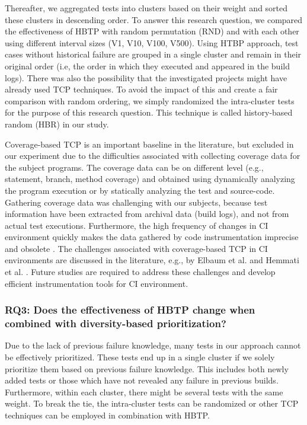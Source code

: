 \documentclass[1p]{elsarticle}
\begin{document}
Thereafter, we aggregated tests into clusters based on their weight and sorted these clusters in descending order. To answer this research question, we compared the effectiveness of HBTP with random permutation (RND) and with each other using different interval sizes (V1, V10, V100, V500). Using HTBP approach, test cases without historical failure are grouped in a single cluster and remain in their original order (i.e, the order in which they executed and appeared in the build logs). There was also the possibility that the investigated projects might have already used TCP techniques. To avoid the impact of this and create a fair comparison with random ordering, we simply randomized the intra-cluster tests for the purpose of this research question. This technique is called history-based random (HBR) in our study.

Coverage-based TCP is an important baseline in the literature, but excluded in our experiment due to the difficulties associated with collecting coverage data for the subject programs. The coverage data can be on different level (e.g., statement, branch, method coverage) and obtained using dynamically analyzing the program execution or by statically analyzing the test and source-code. Gathering coverage data was challenging with our subjects, because test information have been extracted from archival data (build logs), and not from actual test executions. Furthermore, the high frequency of changes in CI environment quickly makes the data gathered by code instrumentation imprecise and obsolete \cite{elbaum2014techniques}. The challenges associated with coverage-based TCP in CI environments are discussed in the literature, e.g., by Elbaum et al. \cite{elbaum2014techniques} and Hemmati et al. \cite{hemmati2017prioritizing}. Future studies are required to address these challenges and  develop efficient instrumentation tools for CI environment.



 








\subsubsection{RQ3: Does the effectiveness of HBTP change when combined with diversity-based prioritization?}

Due to the lack of previous failure knowledge, many tests in our approach cannot be effectively prioritized. These tests end up in a single cluster if we solely prioritize them based on previous failure knowledge. This includes both newly added tests or those which have not revealed any failure in previous builds. Furthermore, within each cluster, there might be several tests with the same weight. To break the tie, the intra-cluster tests can be randomized or other TCP techniques can be employed in combination with HBTP. 
\end{document}
